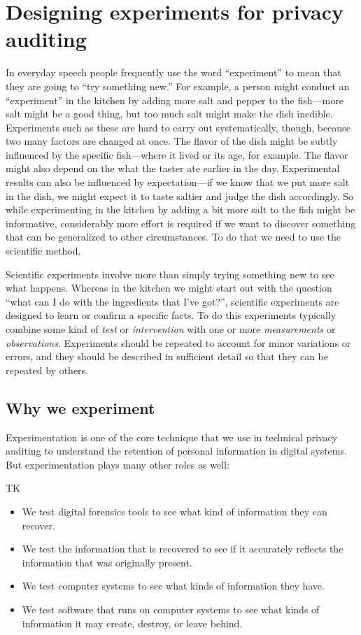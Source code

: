 \chapter{Designing experiments for privacy auditing}

In everyday speech people frequently use the word ``experiment'' to
mean that they are going to ``try something new.'' For example, a
person might conduct an ``experiment'' in the kitchen by adding more
salt and pepper to the fish---more salt might be a good thing, but too
much salt might make the dish inedible.  Experiments such as these are
hard to carry out systematically, though, because two many factors are
changed at once. The flavor of the dish might be subtly influenced by
the specific fish---where it lived or its age, for example. The flavor
might also depend on the what the taster ate earlier in the
day. Experimental results can also be influenced by expectation---if
we know that we put more salt in the dish, we might expect it to taste
saltier and judge the dish accordingly. So while experimenting in the
kitchen by adding a bit more salt to the fish might be informative,
considerably more effort is required if we want to discover something
that can be generalized to other circumstances. To do that we need to
use the scientific method.

Scientific experiments involve more than simply trying something new
to see what happens. Whereas in the kitchen we might start out with
the question ``what can I do with the ingredients that I've got?'',
scientific experiments are designed to learn or confirm a specific
facts. To do this experiments typically combine some kind of
\emph{test} or \emph{intervention} with one or more
\emph{measurements} or \emph{observations}. Experiments should be
repeated to account for minor variations or errors, and they should be
described in sufficient detail so that they can be repeated by
others.

\section{Why we experiment}

Experimentation is one of the core technique that we use in technical privacy
auditing to understand the retention of personal information in
digital systems. But experimentation plays many other roles as well:

TK

\begin{itemize}
\item We test digital forensics tools to see what kind of information they can recover.
\item We test the information that is recovered to see if it
  accurately reflects the information that was originally present.
\item We test computer systems to see what kinds of information they have.
\item We test software that runs on computer systems to see what kinds
  of information it may create, destroy, or leave behind.
\end{itemize}

